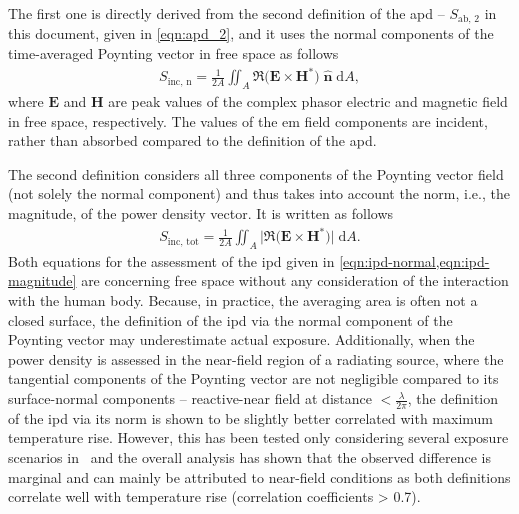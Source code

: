 The first one is directly derived from the second definition of the \gls{apd} -- $S_\text{ab, 2}$ in this document, given in \cref{eqn:apd_2}, and it uses the normal components of the time-averaged Poynting vector in free space as follows
\begin{align}
    \label{eqn:ipd-normal}
    S_\text{inc, n} = \frac{1}{2A} \iint_A \Re \big( \mathbf{E} \times \mathbf{H}^* \big) \; \hat{\boldsymbol{n}} \; \mathrm{d}A,
\end{align}
where $\mathbf{E}$ and $\mathbf{H}$ are peak values of the complex phasor electric and magnetic field in free space, respectively.
The values of the \gls{em} field components are incident, rather than absorbed compared to the definition of the \gls{apd}.

The second definition considers all three components of the Poynting vector field (not solely the normal component) and thus takes into account the norm, i.e., the magnitude, of the power density vector.
It is written as follows
\begin{align}
    \label{eqn:ipd-magnitude}
    S_\text{inc, tot} = \frac{1}{2A} \iint_A \Big | \Re \big( \mathbf{E} \times \mathbf{H}^* \big) \Big | \; \mathrm{d}A.
\end{align}
Both equations for the assessment of the \gls{ipd} given in \cref{eqn:ipd-normal,eqn:ipd-magnitude} are concerning free space without any consideration of the interaction with the human body.
Because, in practice, the averaging area is often not a closed surface, the definition of the \gls{ipd} via the normal component of the Poynting vector may underestimate actual exposure.
Additionally, when the power density is assessed in the near-field region of a radiating source, where the tangential components of the Poynting vector are not negligible compared to its surface-normal components -- reactive-near field at distance $< \frac{\lambda}{2 \pi}$, the definition of the \gls{ipd} via its norm is shown to be slightly better correlated with maximum temperature rise.
However, this has been tested only considering several exposure scenarios in~\cite{IEEE2021Guide} and the overall analysis has shown that the observed difference is marginal and can mainly be attributed to near-field conditions as both definitions correlate well with temperature rise (correlation coefficients > 0.7).